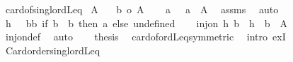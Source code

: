 \begin{isabellebody}
\isanewline
{}\isamarkupfalse%
\ card{\isacharunderscore}{\kern0pt}of{\isacharunderscore}{\kern0pt}singl{\isacharunderscore}{\kern0pt}ordLeq{\isacharcolon}{\kern0pt}\isanewline
{}\ {\isachardoublequoteopen}A\ {\isasymnoteq}\ {\isacharbraceleft}{\kern0pt}{\isacharbraceright}{\kern0pt}{\isachardoublequoteclose}\isanewline
{}\ {\isachardoublequoteopen}{\isacharbar}{\kern0pt}{\isacharbraceleft}{\kern0pt}b{\isacharbraceright}{\kern0pt}{\isacharbar}{\kern0pt}\ {\isasymle}o\ {\isacharbar}{\kern0pt}A{\isacharbar}{\kern0pt}{\isachardoublequoteclose}\isanewline
%
\isadelimproof
%
\endisadelimproof
%
\isatagproof
{}\isamarkupfalse%
{\isacharminus}{\kern0pt}\isanewline
\ \ \isamarkupfalse%
\ a\ \ {\isacharasterisk}{\kern0pt}{\isacharcolon}{\kern0pt}\ {\isachardoublequoteopen}a\ {\isasymin}\ A{\isachardoublequoteclose}\ \isamarkupfalse%
\ assms\ \isamarkupfalse%
\ auto\isanewline
\ \ \isamarkupfalse%
\ {\isacharquery}{\kern0pt}h\ {\isacharequal}{\kern0pt}\ {\isachardoublequoteopen}{\isasymlambda}\ b{\isacharprime}{\kern0pt}{\isacharcolon}{\kern0pt}{\isacharcolon}{\kern0pt}{\isacharprime}{\kern0pt}b{\isachardot}{\kern0pt}\ if\ b{\isacharprime}{\kern0pt}\ {\isacharequal}{\kern0pt}\ b\ then\ a\ else\ undefined{\isachardoublequoteclose}\isanewline
\ \ \isamarkupfalse%
\ {\isachardoublequoteopen}inj{\isacharunderscore}{\kern0pt}on\ {\isacharquery}{\kern0pt}h\ {\isacharbraceleft}{\kern0pt}b{\isacharbraceright}{\kern0pt}\ {\isasymand}\ {\isacharquery}{\kern0pt}h\ {\isacharbackquote}{\kern0pt}\ {\isacharbraceleft}{\kern0pt}b{\isacharbraceright}{\kern0pt}\ {\isasymle}\ A{\isachardoublequoteclose}\isanewline
\ \ \isamarkupfalse%
\ {\isacharasterisk}{\kern0pt}\ \isamarkupfalse%
\ inj{\isacharunderscore}{\kern0pt}on{\isacharunderscore}{\kern0pt}def\ \isamarkupfalse%
\ auto\isanewline
\ \ \isamarkupfalse%
\ {\isacharquery}{\kern0pt}thesis\ \isamarkupfalse%
\ card{\isacharunderscore}{\kern0pt}of{\isacharunderscore}{\kern0pt}ordLeq{\isacharbrackleft}{\kern0pt}symmetric{\isacharbrackright}{\kern0pt}\ \isamarkupfalse%
\ {\isacharparenleft}{\kern0pt}intro\ exI{\isacharparenright}{\kern0pt}\isanewline
{}\isamarkupfalse%
%
\endisatagproof
{\isafoldproof}%
%
\isadelimproof
\isanewline
%
\endisadelimproof
\isanewline
{}\isamarkupfalse%
\ Card{\isacharunderscore}{\kern0pt}order{\isacharunderscore}{\kern0pt}singl{\isacharunderscore}{\kern0pt}ordLeq{\isacharcolon}{\kern0pt}\isanewline

\end{isabellebody}
